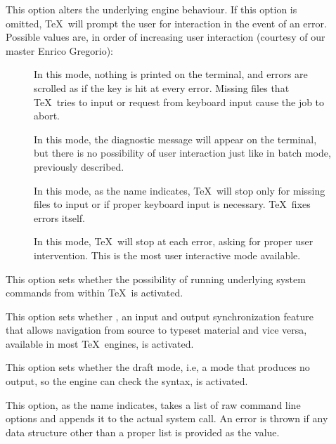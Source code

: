 \begin{description}
\begin{description}
\item[] This option alters the underlying engine behaviour. If this option is omitted, \TeX\ will prompt the user for interaction in the event of an error. Possible values are, in order of increasing user interaction (courtesy of our master Enrico Gregorio):

\begin{description}
\item[] In this mode, nothing is printed on the terminal, and errors are scrolled as if the  key is hit at every error. Missing files that \TeX\ tries to input or request from keyboard input cause the job to abort.

\item[] In this mode, the diagnostic message will appear on the terminal, but there is no possibility of user interaction just like in batch mode, previously described.

\item[] In this mode, as the name indicates, \TeX\ will stop only for missing files to input or if proper keyboard input is necessary. \TeX\ fixes errors itself.

\item[] In this mode, \TeX\ will stop at each error, asking for proper user intervention. This is the most user interactive mode available.
\end{description}

\item[] This option sets whether the possibility of running underlying system commands from within \TeX\ is activated.

\item[] This option sets whether , an input and output synchronization feature that allows navigation from source to typeset material and vice versa, available in most \TeX\ engines, is activated.

\item[] This option sets whether the draft mode, i.e, a mode that produces no output, so the engine can check the syntax, is activated.

\item[] This option, as the name indicates, takes a list of raw command line options and appends it to the actual system call. An error is thrown if any data structure other than a proper list is provided as the value.
\end{description}


\end{description}
